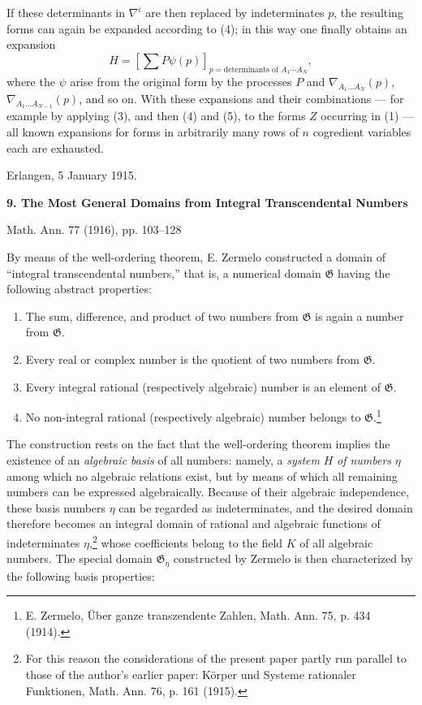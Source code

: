 \documentclass[11pt]{article}
\begin{document}
If these determinants in $\nabla^i$ are then replaced by indeterminates $p$, the resulting forms can again be expanded according to (4); in this way one finally obtains an expansion
\begin{equation}
  H=\left[\sum P\psi(p)\right]_{p=\text{determinants of }A_1\cdots A_N},
\tag{5}
\end{equation}
where the $\psi$ arise from the original form by the processes $P$ and $\nabla_{A_1\ldots A_N}(p)$, $\nabla_{A_1\ldots A_{N-1}}(p)$, and so on. With these expansions and their combinations --- for example by applying (3), and then (4) and (5), to the forms $Z$ occurring in (1) --- all known expansions for forms in arbitrarily many rows of $n$ cogredient variables each are exhausted.

Erlangen, 5 January 1915.



\clearpage

\begin{center}
{\Large\bfseries 9. The Most General Domains from Integral Transcendental Numbers}\par
\vspace{1.2em}
Math. Ann. 77 (1916), pp. 103--128
\end{center}

By means of the well-ordering theorem, E. Zermelo constructed a domain of
``integral transcendental numbers,'' that is, a numerical domain $\mathfrak G$
having the following abstract properties:
\begin{enumerate}
\item[I.] The sum, difference, and product of two numbers from $\mathfrak G$ is
again a number from $\mathfrak G$.
\item[II.] Every real or complex number is the quotient of two numbers from
$\mathfrak G$.
\item[III.] Every integral rational (respectively algebraic) number is an element
of $\mathfrak G$.
\item[IV.] No non-integral rational (respectively algebraic) number belongs to
$\mathfrak G$.\footnote{E. Zermelo, Über ganze transzendente Zahlen,
Math. Ann. 75, p. 434 (1914).}
\end{enumerate}

The construction rests on the fact that the well-ordering theorem implies the
existence of an \emph{algebraic basis} of all numbers: namely, a \emph{system}
$H$ \emph{of numbers} $\eta$ among which no algebraic relations exist, but by
means of which all remaining numbers can be expressed algebraically. Because of
their algebraic independence, these basis numbers $\eta$ can be regarded as
indeterminates, and the desired domain therefore becomes an integral domain of
rational and algebraic functions of indeterminates $\eta$,\footnote{For this
reason the considerations of the present paper partly run parallel to those of the
author's earlier paper: Körper und Systeme rationaler Funktionen, Math. Ann. 76,
p. 161 (1915).} whose coefficients belong to the field $K$ of all algebraic
numbers. The special domain $\mathfrak G_\eta$ constructed by Zermelo is then
characterized by the following basis properties:
\end{document}
